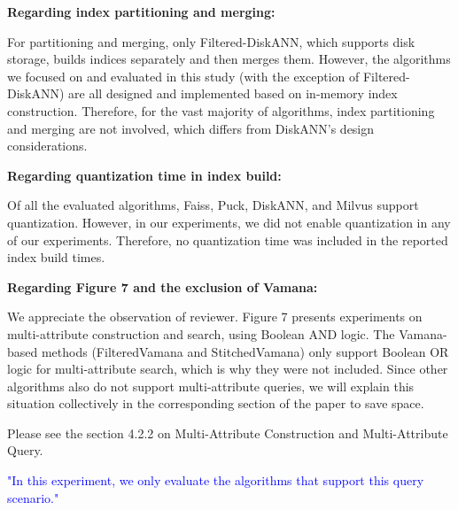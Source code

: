 \documentclass[sigconf, nonacm]{acmart}
\begin{document}
\textbf{Regarding index partitioning and merging:}

For partitioning and merging, only Filtered-DiskANN, which supports disk storage, builds indices separately and then merges them. However, the algorithms we focused on and evaluated in this study (with the exception of Filtered-DiskANN) are all designed and implemented based on in-memory index construction. Therefore, for the vast majority of algorithms, index partitioning and merging are not involved, which differs from DiskANN's design considerations.

\textbf{Regarding quantization time in index build:}

Of all the evaluated algorithms, Faiss, Puck, DiskANN, and Milvus support quantization. However, in our experiments, we did not enable quantization in any of our experiments. Therefore, no quantization time was included in the reported index build times.

\textbf{Regarding Figure 7 and the exclusion of Vamana:}

We appreciate the observation of reviewer. Figure 7 presents experiments on multi-attribute construction and search, using Boolean AND logic. The Vamana-based methods (FilteredVamana and StitchedVamana) only support Boolean OR logic for multi-attribute search, which is why they were not included. Since other algorithms also do not support multi-attribute queries, we will explain this situation collectively in the corresponding section of the paper to save space.

Please see the section 4.2.2 on Multi-Attribute Construction and Multi-Attribute Query.

\textcolor{blue}{"In this experiment, we only evaluate the algorithms that support this query scenario."}


\end{document}
